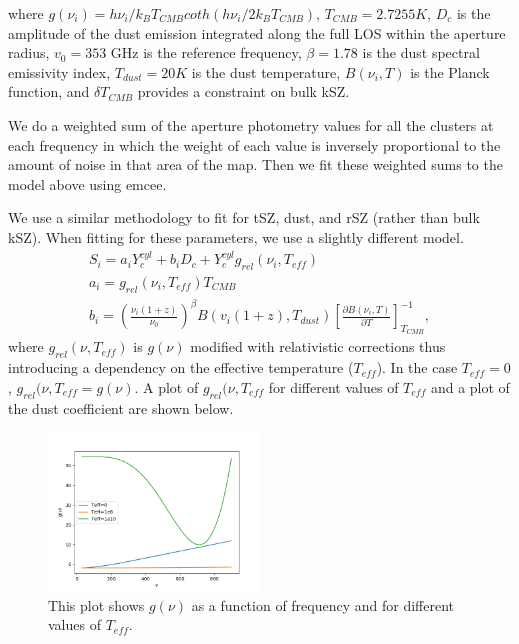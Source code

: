 \documentclass{princeton_astro_thesis}
\begin{document}
where $g(\nu_i)=h\nu_i/k_B T_{CMB} coth(h\nu_i/2k_B T_{CMB})$, $T_{CMB}=2.7255 K$, $D_c$ is the amplitude of the dust emission integrated along the full LOS within the aperture radius, $v_0=353$ GHz is the reference frequency, $\beta=1.78$ is the dust spectral emissivity index, $T_{dust}= 20 K$ is the dust temperature, $B(\nu_i,T)$ is the Planck function, and $\delta T_{CMB}$ provides a constraint on bulk kSZ.\par 
We do a weighted sum of the aperture photometry values for all the clusters at each frequency in which the weight of each value is inversely proportional to the amount of noise in that area of the map. Then we fit these weighted sums to the model above using emcee.
\par We use a similar methodology to fit for tSZ, dust, and rSZ (rather than bulk kSZ). When fitting for these parameters, we use a slightly different model.
\begin{equation}
\begin{aligned}
S_i=a_i Y^{cyl}_{c}+b_i D_c +Y^{cyl}_{c}g_{rel}(\nu_i,T_{eff}) \\
a_i=g_{rel}(\nu_i,T_{eff}) T_{CMB}\\
b_i=\left(\frac{\nu_i(1+z)}{\nu_0}\right)^\beta B (v_i(1+z),T_{dust})\left[\frac{\partial B(\nu_i,T)}{\partial T} \right]^{-1}_{T_{CMB}},
\end{aligned}
\end{equation}
where $g_{rel}(\nu,T_{eff})$ is $g(\nu)$ modified with relativistic corrections thus introducing a dependency on the effective temperature ($T_{eff}$). In the case $T_{eff}=0$, $g_{rel}(\nu,T_{eff}=g(\nu)$. A plot of $g_{rel}(\nu,T_{eff}$ for different values of $T_{eff}$ and a plot of the dust coefficient are shown below.

\begin{figure}[h]
\centering
\includegraphics[width=0.5\textwidth]{../gnu.png}
\caption{This plot shows $g(\nu)$ as a function of frequency and for different values of $T_{eff}$. }
\end{figure}
\end{document}
